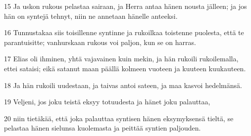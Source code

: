 \par 15 Ja uskon rukous pelastaa sairaan, ja Herra antaa hänen nousta jälleen; ja jos hän on syntejä tehnyt, niin ne annetaan hänelle anteeksi.
\par 16 Tunnustakaa siis toisillenne syntinne ja rukoilkaa toistenne puolesta, että te parantuisitte; vanhurskaan rukous voi paljon, kun se on harras.
\par 17 Elias oli ihminen, yhtä vajavainen kuin mekin, ja hän rukoili rukoilemalla, ettei sataisi; eikä satanut maan päällä kolmeen vuoteen ja kuuteen kuukauteen.
\par 18 Ja hän rukoili uudestaan, ja taivas antoi sateen, ja maa kasvoi hedelmänsä.
\par 19 Veljeni, jos joku teistä eksyy totuudesta ja hänet joku palauttaa,
\par 20 niin tietäkää, että joka palauttaa syntisen hänen eksymyksensä tieltä, se pelastaa hänen sielunsa kuolemasta ja peittää syntien paljouden.



